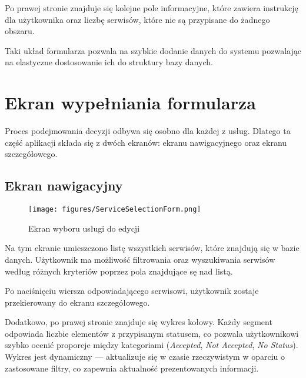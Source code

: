  Po  prawej stronie znajduje się kolejne pole informacyjne, które zawiera instrukcję dla użytkownika oraz liczbę serwisów, które nie są przypisane do żadnego obszaru.
\vspace{0.5cm}

Taki układ formularza pozwala na szybkie dodanie danych do systemu pozwalając na elastyczne dostosowanie ich do struktury bazy danych.

\section{Ekran wypełniania formularza}
Proces podejmowania decyzji odbywa się osobno dla każdej z usług. Dlatego ta część aplikacji składa się z dwóch ekranów: ekranu nawigacyjnego oraz ekranu szczegółowego.

\subsection{Ekran nawigacyjny}
 \begin{figure}[h]
 \centering
 \texttt{[image: figures/ServiceSelectionForm.png]}
 \caption{Ekran wyboru usługi do edycji}
 \label{fig:ServiceSelectionForm }
 \end{figure}

 Na tym ekranie umieszczono listę wszystkich serwisów, które znajdują się w bazie danych. Użytkownik ma możliwość filtrowania oraz wyszukiwania serwisów według różnych kryteriów poprzez pola znajdujące sę nad listą.

 Po naciśnięciu wiersza odpowiadającego serwisowi, użytkownik zostaje przekierowany do ekranu szczegółowego.

 Dodatkowo, po prawej stronie znajduje się wykres kołowy. Każdy segment odpowiada liczbie elementów z przypisanym statusem, co pozwala użytkownikowi szybko ocenić proporcje między kategoriami (\emph{Accepted}, \emph{Not Accepted}, \emph{No Status}). Wykres jest dynamiczny — aktualizuje się w czasie rzeczywistym w oparciu o zastosowane filtry, co zapewnia aktualność prezentowanych informacji.
